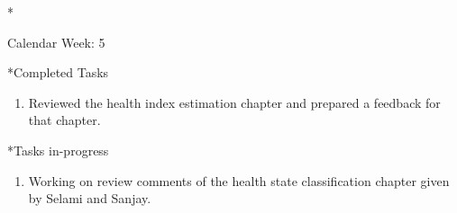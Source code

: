 \documentclass[11pt,a4paper]{article}
\begin{document}
\newpage
\begin{section}*{Calendar Week: 5 \hfill \date{5 February, 2021}}
    \begin{subsection}*{Completed Tasks}
        \begin{enumerate}
            \item
                Reviewed the health index estimation chapter and prepared a feedback for that chapter.
        \end{enumerate}
    \end{subsection}
    
    \begin{subsection}*{Tasks in-progress}
        \begin{enumerate}
            \item
                Working on review comments of the health state classification chapter given by Selami and Sanjay.
        \end{enumerate}
    \end{subsection}
\end{section}
\end{document}

